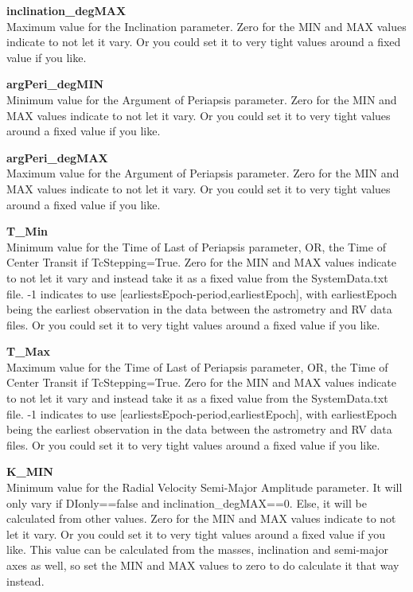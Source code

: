 \documentclass[12pt,preprint]{aastex}
\begin{document}
{\bf inclination\_degMAX}\\
Maximum value for the Inclination parameter.
Zero for the MIN and MAX values indicate to not let it vary.  Or you could set it to very tight values around a fixed value if you like.

{\bf argPeri\_degMIN}\\
Minimum value for the Argument of Periapsis parameter.
Zero for the MIN and MAX values indicate to not let it vary.  Or you could set it to very tight values around a fixed value if you like.

{\bf argPeri\_degMAX}\\
Maximum value for the Argument of Periapsis parameter.
Zero for the MIN and MAX values indicate to not let it vary.  Or you could set it to very tight values around a fixed value if you like.

{\bf T\_Min}\\
Minimum value for the Time of Last of Periapsis parameter, OR, the Time of Center Transit if TcStepping=True.
Zero for the MIN and MAX values indicate to not let it vary and instead take it as a fixed value from the SystemData.txt file.  -1 indicates to use [earliestsEpoch-period,earliestEpoch], with earliestEpoch being the earliest observation in the data between the astrometry and RV data files.  Or you could set it to very tight values around a fixed value if you like.

{\bf T\_Max}\\
Maximum value for the Time of Last of Periapsis parameter, OR, the Time of Center Transit if TcStepping=True.
Zero for the MIN and MAX values indicate to not let it vary and instead take it as a fixed value from the SystemData.txt file.  -1 indicates to use [earliestsEpoch-period,earliestEpoch], with earliestEpoch being the earliest observation in the data between the astrometry and RV data files.  Or you could set it to very tight values around a fixed value if you like.

{\bf K\_MIN}\\
Minimum value for the Radial Velocity Semi-Major Amplitude parameter.  It will only vary if DIonly==false and inclination\_degMAX==0.  Else, it will be calculated from other values.
Zero for the MIN and MAX values indicate to not let it vary.  Or you could set it to very tight values around a fixed value if you like.  This value can be calculated from the masses, inclination and semi-major axes as well, so set the MIN and MAX values to zero to do calculate it that way instead.
\end{document}
